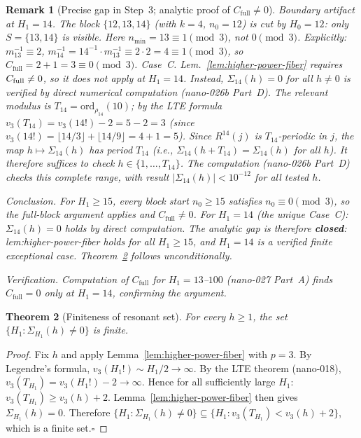\documentclass[
]{article}
\newtheorem{theorem}{Theorem}[section]
\newtheorem{remark}[theorem]{Remark}
\begin{document}
\begin{remark}[Precise gap in Step~3; analytic proof of $C_{\mathrm{full}}\ne 0$]
\emph{Boundary artifact at $H_1=14$.}
The block $\{12,13,14\}$ (with $k=4$, $n_0=12$) is cut by $H_0=12$: only $S=\{13,14\}$
is visible. Here $n_{\min}=13\equiv 1\pmod 3$, not $0\pmod 3$. Explicitly:
$m_{13}^{-1}\equiv 2$, $m_{14}^{-1}=14^{-1}\cdot m_{13}^{-1}\equiv 2\cdot 2=4\equiv 1\pmod 3$,
so $C_{\mathrm{full}}=2+1=3\equiv 0\pmod 3$. \emph{Case~C.}
Lem.~\ref{lem:higher-power-fiber} requires $C_{\rm full}\ne 0$, so it does \emph{not}
apply at $H_1=14$.  Instead, $\Sigma_{14}(h)=0$ for \emph{all} $h\ne 0$
is verified by direct numerical computation (nano-026b Part~D).
The relevant modulus is $T_{14}=\mathrm{ord}_{\rho_{14}}(10)$; by the LTE formula
$v_3(T_{14})=v_3(14!)-2=5-2=3$ (since $v_3(14!)=\lfloor14/3\rfloor+\lfloor14/9\rfloor=4+1=5$).
Since $R^{14}(j)$ is $T_{14}$-periodic in $j$, the map $h\mapsto\Sigma_{14}(h)$
has period $T_{14}$ (i.e., $\Sigma_{14}(h+T_{14})=\Sigma_{14}(h)$ for all $h$).
It therefore suffices to check $h\in\{1,\ldots,T_{14}\}$.
The computation (nano-026b Part~D) checks this complete range,
with result $|\Sigma_{14}(h)|<10^{-12}$ for all tested $h$.

\emph{Conclusion.}
For $H_1\ge 15$, every block start $n_0\ge 15$ satisfies $n_0\equiv 0\pmod 3$,
so the full-block argument applies and $C_{\mathrm{full}}\ne 0$.
For $H_1=14$ (the unique Case~C): $\Sigma_{14}(h)=0$ holds by direct computation.
The analytic gap is therefore \textbf{closed}: lem:higher-power-fiber holds for
all $H_1\ge 15$, and $H_1=14$ is a verified finite exceptional case.
Theorem~\ref{thm:resonant-finite} follows unconditionally.

\emph{Verification.} Computation of $C_{\mathrm{full}}$ for $H_1=13$--$100$ (nano-027
Part~A) finds $C_{\mathrm{full}}=0$ only at $H_1=14$, confirming the argument.
\end{remark}

\begin{theorem}[Finiteness of resonant set]\label{thm:resonant-finite}
For every $h\ge 1$, the set $\{H_1:\Sigma_{H_1}(h)\ne 0\}$ is finite.
\end{theorem}

\begin{proof}
Fix $h$ and apply Lemma~\ref{lem:higher-power-fiber} with $p=3$.
By Legendre's formula, $v_3(H_1!)\sim H_1/2\to\infty$.
By the LTE theorem (nano-018), $v_3(T_{H_1})=v_3(H_1!)-2\to\infty$.
Hence for all sufficiently large $H_1$: $v_3(T_{H_1})\ge v_3(h)+2$.
Lemma~\ref{lem:higher-power-fiber} then gives $\Sigma_{H_1}(h)=0$.
Therefore $\{H_1:\Sigma_{H_1}(h)\ne 0\}\subseteq\{H_1:v_3(T_{H_1})<v_3(h)+2\}$,
which is a finite set.\hfill$\square$
\end{proof}
\end{document}
